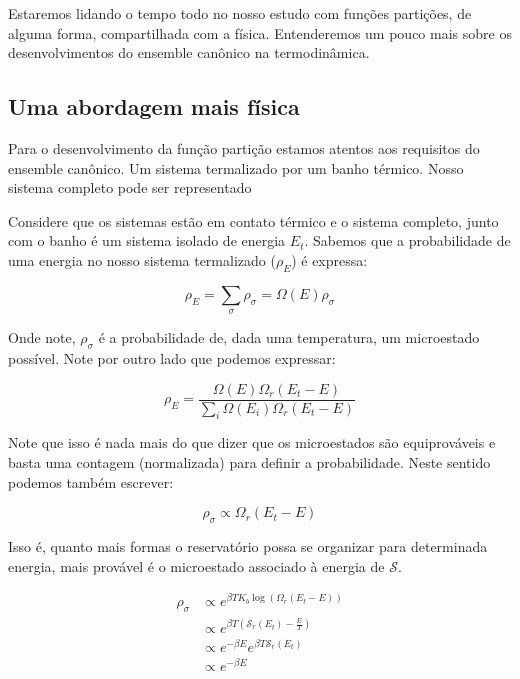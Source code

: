 Estaremos lidando o tempo todo no nosso estudo com funções partições, de alguma forma, compartilhada com a física. Entenderemos um pouco mais sobre os desenvolvimentos do ensemble canônico na termodinâmica.


\subsection{Uma abordagem mais física}

Para o desenvolvimento da função partição estamos atentos aos requisitos do ensemble canônico. Um sistema termalizado por um banho térmico. Nosso sistema completo pode ser representado

\begin{center}
\end{center}

Considere que os sistemas estão em contato térmico e o sistema completo, junto com o banho é um sistema isolado de energia $E_t$. Sabemos que a probabilidade de uma energia no nosso sistema termalizado ($\rho_E$) é expressa:

\[
	\rho_E = \sum_{\sigma} \rho_\sigma = \Omega(E)\rho_\sigma
\]

Onde note, $\rho_\sigma$ é a probabilidade de, dada uma temperatura, um microestado possível. Note por outro lado que podemos expressar:

\[
	\rho_E = \frac{\Omega(E) \Omega_r (E_t - E)}{\sum_{i} \Omega(E_i) \Omega_r(E_t-E)}
\]

Note que isso é nada mais do que dizer que os microestados são equiprováveis e basta uma contagem (normalizada) para definir a probabilidade. Neste sentido podemos também escrever:

\[
	\rho_\sigma \propto \Omega_r(E_t - E)
\]

Isso é, quanto mais formas o reservatório possa se organizar para determinada energia, mais provável é o microestado associado à energia de $\mathcal{S}$.

\begin{align*}
	\rho_\sigma & \propto e^{\beta T K_b \log{(\Omega_r(E_t - E))}} \\
				& \propto e^{\beta T \left( \mathcal{S}_r(E_t) - \frac{E}{T}\right) } \\
				& \propto e^{-\beta E} e^{\beta T \mathcal{S}_r(E_t)} \\
				& \propto e^{-\beta E}
\end{align*}

